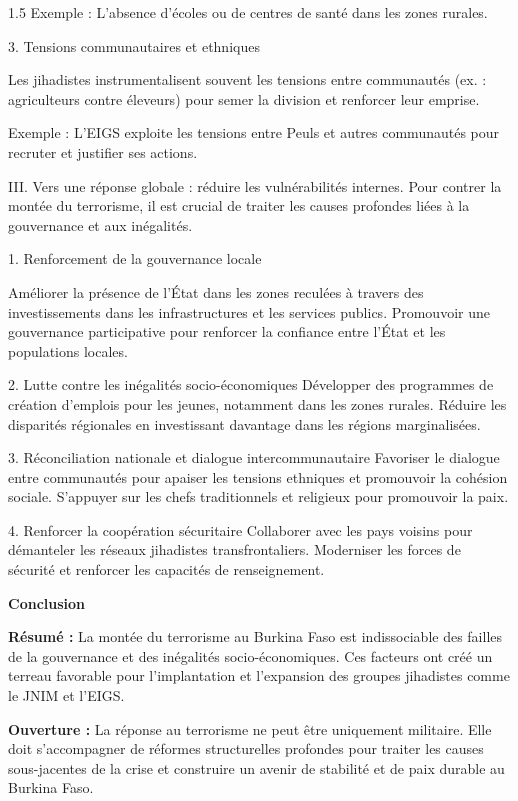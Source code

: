 \documentclass[12pt]{article}
\begin{document}
\begin{spacing}{1.5}
Exemple : L'absence d'écoles ou de centres de santé dans les zones rurales.

3. Tensions communautaires et ethniques

Les jihadistes instrumentalisent souvent les tensions entre communautés (ex. : agriculteurs contre éleveurs) pour semer la division et renforcer leur emprise.

Exemple : L’EIGS exploite les tensions entre Peuls et autres communautés pour recruter et justifier ses actions.

\quad

III. Vers une réponse globale : réduire les vulnérabilités internes.
Pour contrer la montée du terrorisme, il est crucial de traiter les causes profondes liées à la gouvernance et aux inégalités.

1. Renforcement de la gouvernance locale

Améliorer la présence de l’État dans les zones reculées à travers des investissements dans les infrastructures et les services publics.
Promouvoir une gouvernance participative pour renforcer la confiance entre l’État et les populations locales.

2. Lutte contre les inégalités socio-économiques
Développer des programmes de création d'emplois pour les jeunes, notamment dans les zones rurales.
Réduire les disparités régionales en investissant davantage dans les régions marginalisées.

3. Réconciliation nationale et dialogue intercommunautaire
Favoriser le dialogue entre communautés pour apaiser les tensions ethniques et promouvoir la cohésion sociale.
S'appuyer sur les chefs traditionnels et religieux pour promouvoir la paix.

4. Renforcer la coopération sécuritaire
Collaborer avec les pays voisins pour démanteler les réseaux jihadistes transfrontaliers.
Moderniser les forces de sécurité et renforcer les capacités de renseignement.

\quad

\textbf{ Conclusion}

\textbf{ Résumé :} La montée du terrorisme au Burkina Faso est indissociable des failles de la gouvernance et des inégalités socio-économiques. Ces facteurs ont créé un terreau favorable pour l'implantation et l'expansion des groupes jihadistes comme le JNIM et l’EIGS.


\textbf{Ouverture :} La réponse au terrorisme ne peut être uniquement militaire. Elle doit s'accompagner de réformes structurelles profondes pour traiter les causes sous-jacentes de la crise et construire un avenir de stabilité et de paix durable au Burkina Faso.



\end{spacing}
\end{document}

